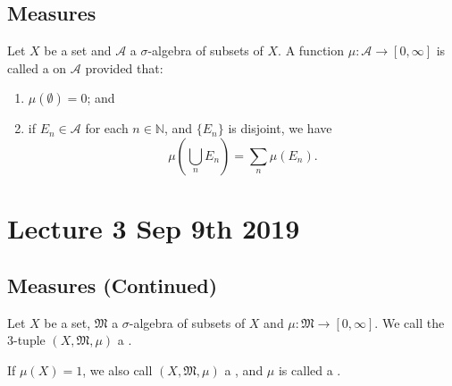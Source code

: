 \documentclass[notoc,notitlepage]{tufte-book}
\begin{document}
\section{Measures}%
\label{sec:measures}

\begin{defn}[Measure]\label{defn:measure}
  Let $X$ be a set and $\mathcal{A}$ a $\sigma$-algebra of subsets of $X$.
  A function $\mu : \mathcal{A} \to [0, \infty]$ is called
  a  on $\mathcal{A}$ provided that:
  \begin{enumerate}
    \item $\mu(\emptyset) = 0$; and
    \item if $E_n \in \mathcal{A}$ for each $n \in \mathbb{N}$,
      and $\{ E_n \}$ is disjoint, we have
      \begin{equation*}
        \mu \left( \bigcup_{n} E_n \right) = \sum_{n} \mu(E_n).
      \end{equation*}
  \end{enumerate}
\end{defn}



\chapter{Lecture 3 Sep 9th 2019}%
\label{chp:lecture_3_sep_9th_2019}

\section{Measures (Continued)}%
\label{sec:measures_continued}

\begin{defn}\label{defn:measure_space}
  Let $X$ be a set, $\mathfrak{M}$ a $\sigma$-algebra of subsets of $X$
  and $\mu : \mathfrak{M} \to [0, \infty]$.
  We call the 3-tuple $(X, \mathfrak{M}, \mu)$ a .
\end{defn}

\begin{remark}
  If $\mu(X) = 1$, we also call $(X, \mathfrak{M}, \mu)$ a
  ,
  and $\mu$ is called a .
\end{remark}
\end{document}
